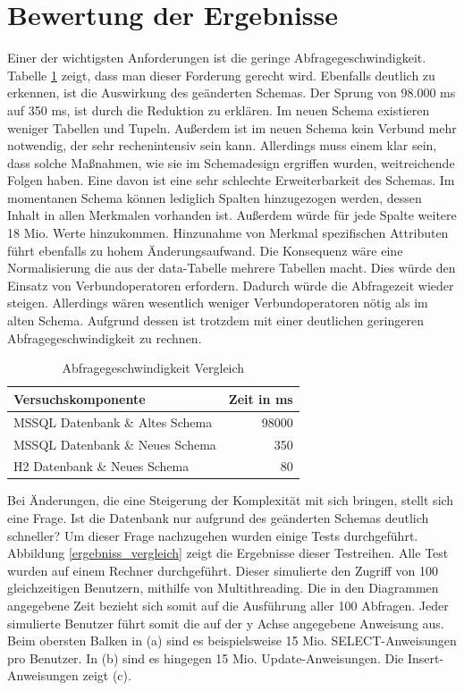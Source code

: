 \section{Bewertung der Ergebnisse}
\label{ch:Ergebnis:sec:bewertung}

Einer der wichtigsten Anforderungen ist die geringe Abfragegeschwindigkeit. Tabelle \ref{tb:vergleichAbfragegeschwindigkeit} zeigt, dass man dieser Forderung gerecht wird. Ebenfalls deutlich zu erkennen, ist die Auswirkung des geänderten Schemas. Der Sprung von 98.000 ms auf 350 ms, ist durch die Reduktion zu erklären. Im neuen Schema existieren weniger Tabellen und Tupeln. Außerdem ist im neuen Schema kein Verbund mehr notwendig, der sehr rechenintensiv sein kann. Allerdings muss einem klar sein, dass solche Maßnahmen, wie sie im Schemadesign ergriffen wurden, weitreichende Folgen haben. Eine davon ist eine sehr schlechte Erweiterbarkeit des Schemas. Im momentanen Schema können lediglich Spalten hinzugezogen werden, dessen Inhalt in allen Merkmalen vorhanden ist. Außerdem würde für jede Spalte weitere 18 Mio. Werte hinzukommen. Hinzunahme von Merkmal spezifischen Attributen führt ebenfalls zu hohem Änderungsaufwand. Die Konsequenz wäre eine Normalisierung die aus der data-Tabelle mehrere Tabellen macht. Dies würde den Einsatz von Verbundoperatoren erfordern. Dadurch würde die Abfragezeit wieder steigen. Allerdings wären wesentlich weniger Verbundoperatoren nötig als im alten Schema. Aufgrund dessen ist trotzdem mit einer deutlichen geringeren Abfragegeschwindigkeit zu rechnen.  

\begin{table}[htbp]
\centering
\begin{tabular} {l | r}
Versuchskomponente & Zeit in ms  \\ \hline
MSSQL Datenbank \& Altes Schema & 98000 \\
MSSQL Datenbank \& Neues Schema & 350 \\
H2 Datenbank \& Neues Schema & 80 \\
\end{tabular}
\caption{Abfragegeschwindigkeit Vergleich}
\label{tb:vergleichAbfragegeschwindigkeit}
\end{table}

Bei Änderungen, die eine Steigerung der Komplexität mit sich bringen, stellt sich eine Frage. Ist die Datenbank nur aufgrund des geänderten Schemas deutlich schneller? Um dieser Frage nachzugehen wurden einige Tests durchgeführt. Abbildung \ref{ergebniss_vergleich} zeigt die Ergebnisse dieser Testreihen. Alle Test wurden auf einem Rechner durchgeführt. Dieser simulierte den Zugriff von 100 gleichzeitigen Benutzern, mithilfe von Multithreading. Die in den Diagrammen angegebene Zeit bezieht sich somit auf die Ausführung aller 100 Abfragen. Jeder simulierte Benutzer führt somit die auf der y Achse angegebene Anweisung aus. Beim obersten Balken in (a) sind es beispielsweise 15 Mio. SELECT-Anweisungen pro Benutzer. In (b) sind es hingegen 15 Mio. Update-Anweisungen. Die Insert-Anweisungen zeigt (c).    

